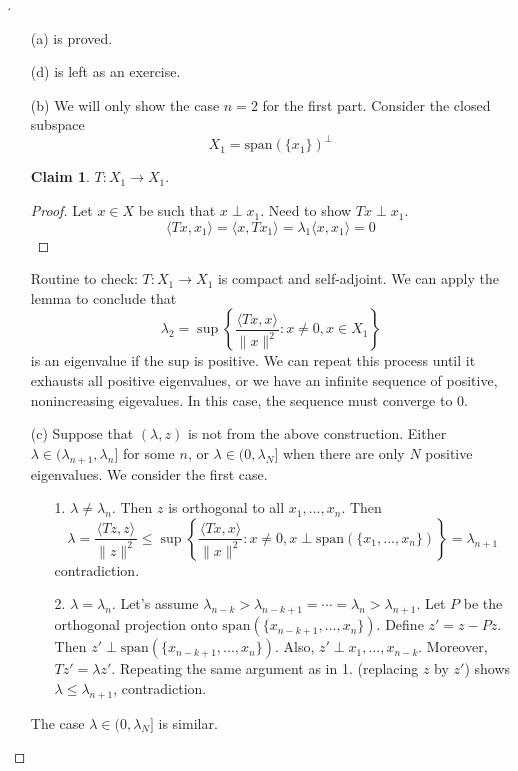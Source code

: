 \documentclass{article}
\theoremstyle{definition}
\newtheorem*{clm}{Claim}
\newenvironment{proofs}[1][\proofname]{%
  \begin{proof}[#1]$ $\par\nobreak\ignorespaces
}{%
  \end{proof}
}
\begin{document}
\begin{proofs}
	\begin{enumerate}
		\item[(a)] is proved.

		\item[(d)] is left as an exercise.

		\item[(b)] We will only show the case $n = 2$ for the first part.
			Consider the closed subspace
			\[
				X_1 = \text{span}(\{x_1\})^{\perp}
			\]
			\begin{clm}
				$T: X_1 \to X_1$.
			\end{clm}
			
			\begin{proof}
				Let $x \in X$ be such that $x \perp x_1$.
				Need to show $T x \perp x_1$.
				\[
					\langle T x, x_1 \rangle = \langle x, T  x_1 \rangle = \lambda_1 \langle x, x_1 \rangle = 0
				\]
			\end{proof}
			Routine to check: $T: X_1 \to X_1$ is compact and self-adjoint.
			We can apply the lemma to conclude that
			\[
				\lambda_2 = \sup \left\{ \frac{\langle T x, x \rangle}{\|x\|^2}: x \neq 0, x \in X_1 \right\}
			\]
			is an eigenvalue if the sup is positive.
			We can repeat this process until it exhausts all positive eigenvalues, or we have an infinite sequence of positive, nonincreasing eigevalues.
			In this case, the sequence must converge to 0.
		\item[(c)] Suppose that $(\lambda, z)$ is not from the above construction.
			Either $\lambda \in (\lambda_{n + 1}, \lambda_n]$ for some $n$, or $\lambda \in (0, \lambda_N]$ when there are only $N$ positive eigenvalues.
			We consider the first case.
			\begin{enumerate}
				\item[1.] $\lambda \neq \lambda_n$.
					Then $z$ is orthogonal to all $x_1, ..., x_n$.
					Then 
					\[
						\lambda = \frac{\langle T z, z \rangle}{\|z\|^2} \leq \sup \left\{ \frac{\langle T x, x \rangle}{\|x\|^2}: x \neq 0, x \perp \text{span}(\{x_1, ..., x_n\}) \right\} = \lambda_{n + 1}
					\]
					contradiction.

				\item[2.] $\lambda = \lambda_n$.
					Let's assume $\lambda_{n - k} > \lambda_{n - k + 1} = \cdots = \lambda_n > \lambda_{n + 1}$.
					Let $P$ be the orthogonal projection onto $\text{span}(\{x_{n - k + 1}, ..., x_n\})$.
					Define $z' = z - P z$.
					Then $z' \perp \text{span}(\{x_{n - k + 1}, ..., x_n\})$.
					Also, $z' \perp x_1, ..., x_{n - k}$.
					Moreover, $T z' = \lambda z'$.
					Repeating the same argument as in 1. (replacing $z$ by $z'$) shows $\lambda \leq \lambda_{n + 1}$, contradiction.
			\end{enumerate}
			The case $\lambda \in (0, \lambda_N]$ is similar.


\end{enumerate}
\end{proofs}
\end{document}
